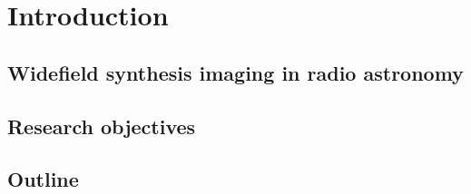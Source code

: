 \chapter{Introduction}
\section{Widefield synthesis imaging in radio astronomy}
\section{Research objectives}
\section{Outline}
